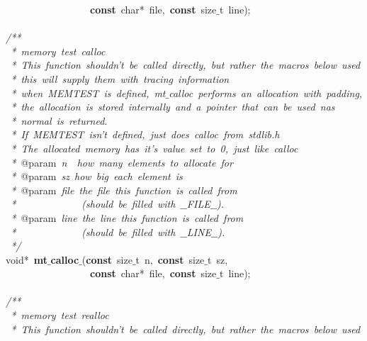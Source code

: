 \documentclass{article}
\begin{document}
\mbox{}\ \ \ \ \ \ \ \ \ \ \ \ \ \ \ \ \ \textbf{const}\ char*\ file,\ \textbf{const}\ size$\_$t\ line); \\
\mbox{} \\
\mbox{}\textit{/**} \\
\mbox{}\textit{\ *\ memory\ test\ calloc} \\
\mbox{}\textit{\ *\ This\ function\ shouldn't\ be\ called\ directly,\ but\ rather\ the\ macros\ below\ used} \\
\mbox{}\textit{\ *\ this\ will\ supply\ them\ with\ tracing\ information} \\
\mbox{}\textit{\ *\ when\ MEMTEST\ is\ defined,\ mt$\_$calloc\ performs\ an\ allocation\ with\ padding,} \\
\mbox{}\textit{\ *\ the\ allocation\ is\ stored\ internally\ and\ a\ pointer\ that\ can\ be\ used\ nas} \\
\mbox{}\textit{\ *\ normal\ is\ returned.} \\
\mbox{}\textit{\ *\ If\ MEMTEST\ isn't\ defined,\ just\ does\ calloc\ from\ stdlib.h} \\
\mbox{}\textit{\ *\ The\ allocated\ memory\ has\ it's\ value\ set\ to\ 0,\ just\ like\ calloc} \\
\mbox{}\textit{\ *\ }@param\textit{\ n\ \ how\ many\ elements\ to\ allocate\ for} \\
\mbox{}\textit{\ *\ }@param\textit{\ sz\ how\ big\ each\ element\ is} \\
\mbox{}\textit{\ *\ }@param\textit{\ file\ the\ file\ this\ function\ is\ called\ from} \\
\mbox{}\textit{\ *\ \ \ \ \ \ \ \ \ \ \ \ \ (should\ be\ filled\ with\ $\_$$\_$FILE$\_$$\_$).} \\
\mbox{}\textit{\ *\ }@param\textit{\ line\ the\ line\ this\ function\ is\ called\ from} \\
\mbox{}\textit{\ *\ \ \ \ \ \ \ \ \ \ \ \ \ (should\ be\ filled\ with\ $\_$$\_$LINE$\_$$\_$).} \\
\mbox{}\textit{\ */} \\
\mbox{}void*\ \textbf{mt$\_$calloc$\_$}(\textbf{const}\ size$\_$t\ n,\ \textbf{const}\ size$\_$t\ sz, \\
\mbox{}\ \ \ \ \ \ \ \ \ \ \ \ \ \ \ \ \ \textbf{const}\ char*\ file,\ \textbf{const}\ size$\_$t\ line); \\
\mbox{} \\
\mbox{}\textit{/**} \\
\mbox{}\textit{\ *\ memory\ test\ realloc} \\
\mbox{}\textit{\ *\ This\ function\ shouldn't\ be\ called\ directly,\ but\ rather\ the\ macros\ below\ used} \\
\end{document}
